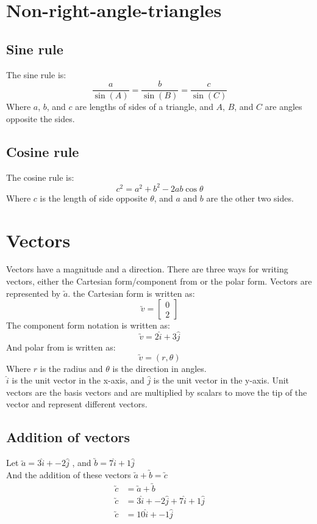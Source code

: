 \documentclass{book}
\begin{document}
\chapter{Non-right-angle-triangles}
\section{Sine rule}
The sine rule is:
\[
	\frac{a}{\sin(A)} = \frac{b}{\sin(B)} = \frac{c}{\sin(C)}
\]
Where $a$, $b$, and $c$ are lengths of sides of a triangle, and $A$, $B$, and $C$ are angles opposite the sides.

\section{Cosine rule}
The cosine rule is:
\[
	c^2 = a^2 + b^2 -2ab\cos\theta
\]
Where $c$ is the length of side opposite $\theta$, and $a$ and $b$ are the other two sides.


\chapter{Vectors}
Vectors have a magnitude and a direction.  There are three ways for writing vectors, either the Cartesian form/component from or the polar form.  Vectors are represented by $\utilde{a}$.  the Cartesian form is written as:
\[
	\utilde{v} = \begin{bmatrix}
		0 \\
		2
	\end{bmatrix}
\]
The component form notation is written as:
\[
	\utilde{v} = 2\hat{i} + 3\hat{j}
\]
And polar from is written as:
\[
	\utilde{v} = (r, \theta)
\]
Where $r$ is the radius and $\theta$ is the direction in angles.\\

$\hat{i}$ is the unit vector in the x-axis, and $\hat{j}$ is the unit vector in the y-axis.  Unit vectors are the basis vectors and are multiplied by scalars to move the tip of the vector and represent different vectors.

\section{Addition of vectors}
Let $\utilde{a} = 3\hat{i} + -2\hat{j}$ , and $\utilde{b} = 7\hat{i} + 1\hat{j}$\\
And the addition of these vectors $\utilde{a} + \utilde{b} = \utilde{c}$\\
\begin{align*}
	\utilde{c} & = \utilde{a} + \utilde{b}                    \\
	\utilde{c} & = 3\hat{i} + -2\hat{j} + 7\hat{i} + 1\hat{j} \\
	\utilde{c} & = 10\hat{i} + -1\hat{j}
\end{align*}
\end{document}
